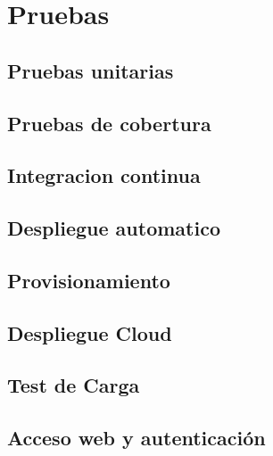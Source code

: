 \chapter{Pruebas}

\section {Pruebas unitarias}
\section {Pruebas de cobertura}
\section {Integracion continua}
\section {Despliegue automatico}
\section {Provisionamiento}
\section {Despliegue Cloud}
\section {Test de Carga}
\section {Acceso web y autenticación}
